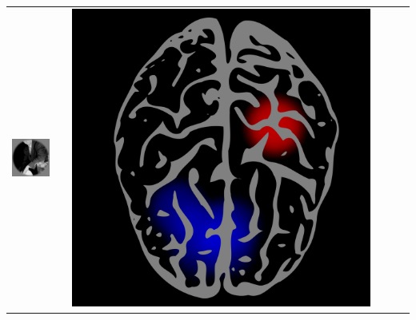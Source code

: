 \documentclass{beamer}
\begin{document}
\begin{frame}
\begin{center}
\begin{tabular}{ccc||ccc}
\includegraphics[scale = .26]{img2.png} & \hspace{0.2in} & \includegraphics[scale = 0.035]{brain2.png} &

\end{tabular}
\end{center}
\end{frame}
\end{document}
